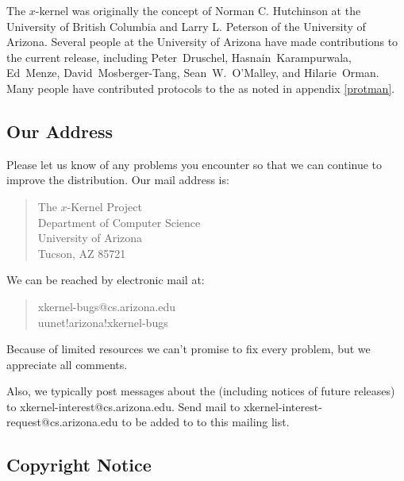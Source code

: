 The $x$-kernel was originally the concept of Norman C. Hutchinson at
the University of British Columbia and Larry L.  Peterson of the
University of Arizona.  Several people at the University of Arizona
have made contributions to the current release, including
Peter~Druschel, Hasnain~Karampurwala, Ed~Menze, David~Mosberger-Tang, 
Sean~W.~O'Malley, and Hilarie~Orman.  Many people have contributed
protocols to the \xk{} as noted in appendix \ref{protman}.


\subsection{Our Address}

Please let us know of any problems you encounter so that we can
continue to improve the distribution. Our mail address is:

\begin{quote}
The $x$-Kernel Project\\
Department of Computer Science\\
University of Arizona\\
Tucson, AZ 85721
\end{quote}

\noindent We can be reached by electronic mail at:

\begin{quote}
xkernel-bugs@cs.arizona.edu\\
uunet!arizona!xkernel-bugs
\end{quote}

\noindent Because of limited resources we can't promise to fix every 
problem, but we appreciate all comments.

Also, we typically post messages about the \xk{} (including notices of
future releases) to xkernel-interest@cs.arizona.edu. Send mail to
xkernel-interest-request@cs.arizona.edu to be added to to this mailing
list.

\subsection{Copyright Notice}


